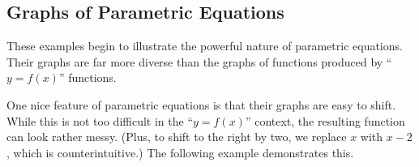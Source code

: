 
\subsection{Graphs of Parametric Equations}

These examples begin to illustrate the powerful nature of parametric equations. Their graphs are far more diverse than the graphs of functions produced by ``$y=f(x)$'' functions.


One nice feature of parametric equations is that their graphs are easy to shift. While this is not too difficult in the ``$y=f(x)$'' context, the resulting function can look rather messy. (Plus, to shift to the right by two, we replace $x$ with $x-2$, which is counterintuitive.) The following example demonstrates this.

